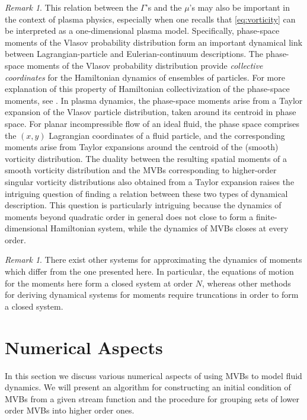 \documentclass[12pt]{amsart}
\theoremstyle{remark}
\newtheorem{rmk}[thm]{Remark}
\begin{document}
	\begin{rmk}
	This relation between the $\Gamma$'s and the $\mu$'s may also be important in the context of plasma physics, especially when one recalls that \eqref{eq:vorticity} can be interpreted as a one-dimensional plasma model.
	Specifically, phase-space moments of the Vlasov probability distribution form an important  dynamical link between Lagrangian-particle and Eulerian-continuum descriptions.
The phase-space moments of the Vlasov probability distribution provide \emph{collective coordinates} for the Hamiltonian dynamics of ensembles of particles.
	For more explanation of this property of Hamiltonian collectivization of the phase-space moments, see \cite{GuilleminSternberg1990,HolmLysenkoScovel1990,GibbonsHolmTronci2008a,GibbonsHolmTronci2008b}.
	In plasma dynamics, the phase-space moments arise from a Taylor expansion of the Vlasov particle distribution, taken around its centroid in phase space. For planar incompressible flow of an ideal fluid, the phase space comprises the $(x,y)$ Lagrangian coordinates of a fluid particle, and the corresponding moments arise from Taylor expansions around the centroid of the (smooth) vorticity distribution. The duality between the resulting spatial moments of a smooth vorticity distribution and the MVBs corresponding to higher-order singular vorticity distributions also obtained from a Taylor expansion raises the intriguing question of finding a relation between these two types of dynamical description. This question is particularly intriguing because the dynamics of moments beyond quadratic order in general does not close to form a finite-dimensional Hamiltonian system, while the dynamics of MVBs closes at every order. 
	\end{rmk}
	
	\begin{rmk}
	There exist other systems for approximating the dynamics of moments which differ from the one presented here.
	In particular, the equations of motion for the moments here form a closed system at order $N$, whereas other methods for deriving dynamical systems for moments
	\cite{UminskyWayneBarbaro2010, NagemSandriUminskyWayne2009,GibbonsHolmTronci2008a,GibbonsHolmTronci2008b}
	require truncations in order to form a closed system.
	\end{rmk}

\section{Numerical Aspects}
\label{sec:numerics}
In this section we discuss various numerical aspects of using MVBs to model fluid dynamics.
We will present an algorithm for constructing an initial condition of MVBs from a given stream
function and the procedure for grouping sets of lower order MVBs into higher order ones.
\end{document}
